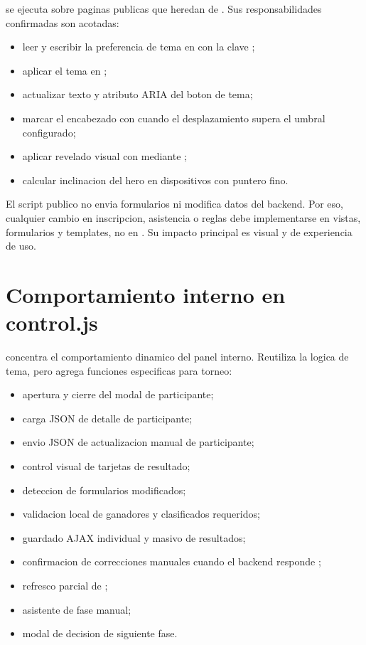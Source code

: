  se ejecuta sobre paginas publicas que heredan de . Sus responsabilidades confirmadas son acotadas:

\begin{itemize}
  \item leer y escribir la preferencia de tema en  con la clave ;
  \item aplicar el tema en ;
  \item actualizar texto y atributo ARIA del boton de tema;
  \item marcar el encabezado con  cuando el desplazamiento supera el umbral configurado;
  \item aplicar revelado visual con  mediante ;
  \item calcular inclinacion del hero en dispositivos con puntero fino.
\end{itemize}

El script publico no envia formularios ni modifica datos del backend. Por eso, cualquier cambio en inscripcion, asistencia o reglas debe implementarse en vistas, formularios y templates, no en . Su impacto principal es visual y de experiencia de uso.

\section{Comportamiento interno en control.js}
\label{sec:javascript-control}

 concentra el comportamiento dinamico del panel interno. Reutiliza la logica de tema, pero agrega funciones especificas para torneo:

\begin{itemize}
  \item apertura y cierre del modal de participante;
  \item carga JSON de detalle de participante;
  \item envio JSON de actualizacion manual de participante;
  \item control visual de tarjetas de resultado;
  \item deteccion de formularios modificados;
  \item validacion local de ganadores y clasificados requeridos;
  \item guardado AJAX individual y masivo de resultados;
  \item confirmacion de correcciones manuales cuando el backend responde ;
  \item refresco parcial de ;
  \item asistente de fase manual;
  \item modal de decision de siguiente fase.
\end{itemize}

